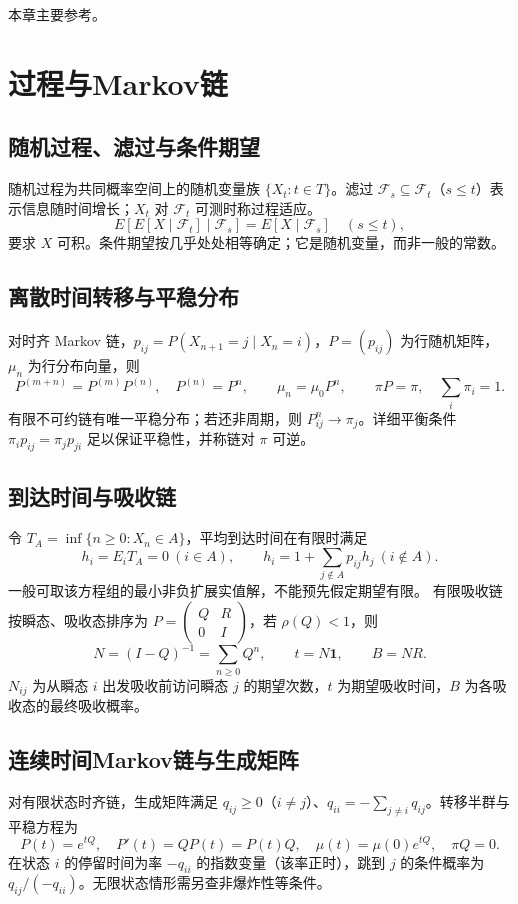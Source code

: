 \documentclass[../main.tex]{subfiles}
\begin{document}
本章主要参考\cite{durrett,legall}。

\section{过程与Markov链}
\subsection{随机过程、滤过与条件期望}
随机过程为共同概率空间上的随机变量族 $\{X_t:t\in T\}$。滤过 $\mathcal F_s\subseteq\mathcal F_t$（$s\le t$）表示信息随时间增长；$X_t$ 对 $\mathcal F_t$ 可测时称过程适应。
\[
E[E[X\mid\mathcal F_t]\mid\mathcal F_s]=E[X\mid\mathcal F_s]\quad(s\le t),
\]
要求 $X$ 可积。条件期望按几乎处处相等确定；它是随机变量，而非一般的常数。
\subsection{离散时间转移与平稳分布}
对时齐 Markov 链，$p_{ij}=P(X_{n+1}=j\mid X_n=i)$，$P=(p_{ij})$ 为行随机矩阵，$\mu_n$ 为行分布向量，则
\[
P^{(m+n)}=P^{(m)}P^{(n)},\quad P^{(n)}=P^n,\qquad
\mu_n=\mu_0P^n,\qquad\pi P=\pi,\quad\sum_i\pi_i=1.
\]
有限不可约链有唯一平稳分布；若还非周期，则 $P^n_{ij}\to\pi_j$。详细平衡条件 $\pi_ip_{ij}=\pi_jp_{ji}$ 足以保证平稳性，并称链对 $\pi$ 可逆。
\subsection{到达时间与吸收链}
令 $T_A=\inf\{n\ge0:X_n\in A\}$，平均到达时间在有限时满足
\[
h_i=E_iT_A=0\ (i\in A),\qquad h_i=1+\sum_{j\notin A}p_{ij}h_j\ (i\notin A).
\]
一般可取该方程组的最小非负扩展实值解，不能预先假定期望有限。
有限吸收链按瞬态、吸收态排序为 $P=\begin{pmatrix}Q&R\\0&I\end{pmatrix}$，若 $\rho(Q)<1$，则
\[
N=(I-Q)^{-1}=\sum_{n\ge0}Q^n,\qquad t=N\bm1,\qquad B=NR.
\]
$N_{ij}$ 为从瞬态 $i$ 出发吸收前访问瞬态 $j$ 的期望次数，$t$ 为期望吸收时间，$B$ 为各吸收态的最终吸收概率。
\subsection{连续时间Markov链与生成矩阵}
对有限状态时齐链，生成矩阵满足 $q_{ij}\ge0$（$i\ne j$）、$q_{ii}=-\sum_{j\ne i}q_{ij}$。转移半群与平稳方程为
\[
P(t)=e^{tQ},\quad P'(t)=QP(t)=P(t)Q,\quad
\mu(t)=\mu(0)e^{tQ},\quad\pi Q=0.
\]
在状态 $i$ 的停留时间为率 $-q_{ii}$ 的指数变量（该率正时），跳到 $j$ 的条件概率为 $q_{ij}/(-q_{ii})$。无限状态情形需另查非爆炸性等条件。
\end{document}
